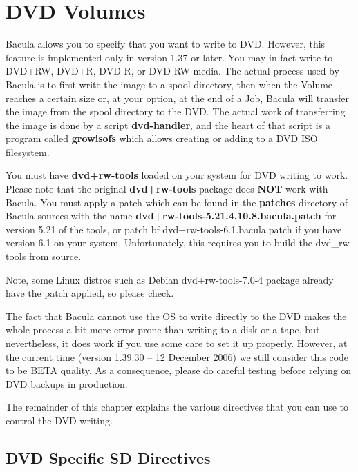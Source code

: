 
\chapter{DVD Volumes}
\label{_DVDChapterStart}

Bacula allows you to specify that you want to write to DVD. However,
this feature is implemented only in version 1.37 or later.
You may in fact write to DVD+RW, DVD+R, DVD-R, or DVD-RW 
media. The actual process used by Bacula is to first write
the image to a spool directory, then when the Volume reaches
a certain size or,  at your option, at the end of a Job, Bacula
will transfer the image from the spool directory to the
DVD.  The actual work of transferring the image is done
by a script {\bf dvd-handler}, and the heart of that
script is a program called {\bf growisofs} which allows
creating or adding to a DVD ISO filesystem.

You must have {\bf dvd+rw-tools} loaded on your system for DVD writing to
work.  Please note that the original {\bf dvd+rw-tools} package does {\bf
NOT} work with Bacula.  You must apply a patch which can be found in the
{\bf patches} directory of Bacula sources with the name
{\bf dvd+rw-tools-5.21.4.10.8.bacula.patch} for version 5.21 of the tools,
or patch {bf dvd+rw-tools-6.1.bacula.patch} if you have version 6.1       
on your system. Unfortunately, this requires you to build the dvd\_rw-tools
from source.

Note, some Linux distros such as Debian dvd+rw-tools-7.0-4 package already
have the patch applied, so please check.

The fact that Bacula cannot use the OS to write directly
to the DVD makes the whole process a bit more error prone than
writing to a disk or a tape, but nevertheless, it does work if you
use some care to set it up properly. However, at the current time
(version 1.39.30 -- 12 December 2006) we still consider this code to be
BETA quality.  As a consequence, please do careful testing before relying
on DVD backups in production.

The remainder of this chapter explains the various directives that you can
use to control the DVD writing.

\label{DVDdirectives}
\section{DVD Specific SD Directives} 

